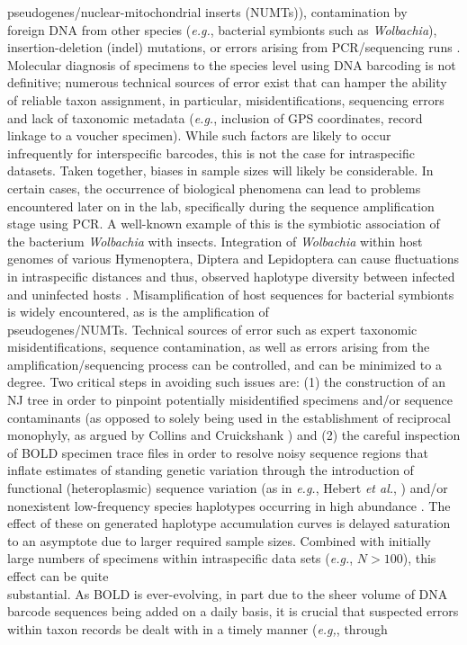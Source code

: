 pseudogenes/nuclear-mitochondrial inserts (NUMTs)), contamination by \\ foreign DNA from other species (\textit{e.g.}, bacterial symbionts such as \textit{Wolbachia}), \\ insertion-deletion (indel) mutations, or errors arising from PCR/sequencing runs \cite{goodall2012comparison}. \\ Molecular diagnosis of specimens to the species level using DNA barcoding is not \\ definitive; numerous technical sources of error exist that can hamper the ability of reliable taxon assignment, in particular, misidentifications, sequencing errors and lack of taxonomic metadata (\textit{e.g.}, inclusion of GPS coordinates, record linkage to a voucher specimen). While such factors are likely to occur infrequently for interspecific barcodes, this is not the case for intraspecific datasets. Taken together, biases in sample sizes  will likely be considerable. In certain cases, the occurrence of biological phenomena can lead to problems encountered later on in the lab, specifically during the sequence amplification stage using PCR. A well-known example of this is the symbiotic association of the bacterium \textit{Wolbachia} with insects. Integration of \textit{Wolbachia} within host genomes of various Hymenoptera, Diptera and Lepidoptera can cause fluctuations in intraspecific distances \cite{smith2012wolbachia} and thus, observed haplotype diversity between infected and uninfected hosts \cite{chen2017effects}. Misamplification of host sequences for bacterial symbionts is widely encountered, as is the amplification of \\ pseudogenes/NUMTs. Technical sources of error such as expert taxonomic \\ misidentifications, sequence contamination, as well as errors arising from the \\ amplification/sequencing process can be controlled, and can be minimized to a degree. Two critical steps in avoiding such issues are: (1) the construction of an NJ tree in order to pinpoint potentially misidentified specimens and/or sequence contaminants (as opposed to solely being used in the establishment of reciprocal monophyly, as argued by Collins and Cruickshank \cite{collins2013seven}) and (2) the careful inspection of BOLD specimen trace files in order to resolve noisy sequence regions that inflate estimates of standing genetic variation through the introduction of functional (heteroplasmic) sequence variation (as in \textit{e.g.}, Hebert \textit{et al.}, \cite{hebert2004ten}) and/or nonexistent low-frequency species haplotypes occurring in high abundance \cite{stoeckle2012frequency}. The effect of these on generated haplotype accumulation curves is delayed saturation to an asymptote due to larger required sample sizes. Combined with initially large numbers of specimens within intraspecific data sets (\textit{e.g.}, $N > 100$), this effect can be quite \\ substantial. As BOLD is ever-evolving, in part due to the sheer volume of DNA barcode sequences being added on a daily basis, it is crucial that suspected errors within taxon records be dealt with in a timely manner (\textit{e.g,}, through 